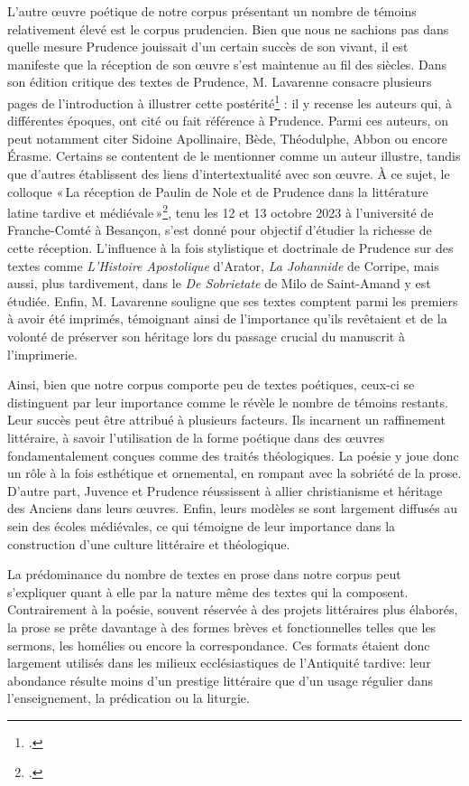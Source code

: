 \documentclass[a4paper,twoside,12pt]{book}
\begin{document}
L’autre œuvre poétique de notre corpus présentant un nombre de témoins relativement élevé est le corpus prudencien. Bien que nous ne sachions pas dans quelle mesure Prudence jouissait d’un certain succès de son vivant, il est manifeste que la réception de son œuvre s’est maintenue au fil des siècles. Dans son édition critique des textes de Prudence, M. Lavarenne consacre plusieurs pages de l’introduction à illustrer cette postérité\footcite[p. XVI–XXI]{Prudencelavarenne} : il y recense les auteurs qui, à différentes époques, ont cité ou  fait référence à Prudence. Parmi ces auteurs, on peut notamment citer Sidoine Apollinaire, Bède, Théodulphe, Abbon ou encore Érasme. Certains se contentent de le mentionner comme un auteur illustre, tandis que d’autres établissent des liens d’intertextualité avec son œuvre. À ce sujet, le colloque « La réception de Paulin de Nole et de Prudence dans la littérature latine tardive et médiévale »\footcite{receptionpaulinprudence}, tenu les 12 et 13 octobre 2023 à l’université de Franche-Comté à Besançon, s’est donné pour objectif d’étudier la richesse de cette réception. L'influence à la fois stylistique et doctrinale de Prudence sur des textes comme \textit{L’Histoire Apostolique} d’Arator, \textit{La Johannide} de Corripe, mais aussi, plus tardivement, dans le \textit{De Sobrietate} de Milo de Saint-Amand y est étudiée. Enfin, M. Lavarenne souligne que ses textes comptent parmi les premiers à avoir été imprimés, témoignant ainsi de l’importance qu’ils revêtaient et de la volonté de préserver son héritage lors du passage crucial du manuscrit à l’imprimerie.


Ainsi, bien que notre corpus comporte peu de textes poétiques, ceux-ci se distinguent par leur importance comme le révèle le nombre de témoins restants. Leur succès  peut être attribué à plusieurs facteurs. Ils incarnent un raffinement littéraire, à savoir l’utilisation de la forme poétique dans des œuvres fondamentalement conçues comme des traités théologiques. La poésie y joue donc un rôle à la fois esthétique et ornemental, en rompant avec la sobriété de la prose. D’autre part, Juvence et Prudence réussissent à allier christianisme et héritage des Anciens dans leurs œuvres. Enfin, leurs modèles se sont largement diffusés au sein des écoles médiévales, ce qui témoigne de leur importance dans la construction d’une culture littéraire et théologique.

La prédominance du nombre de textes en prose dans notre corpus peut s’expliquer quant à elle par la nature même des textes qui la composent. Contrairement à la poésie, souvent réservée à des projets littéraires plus élaborés, la prose se prête davantage à des formes brèves et fonctionnelles telles que les sermons, les homélies ou encore la correspondance. Ces formats étaient donc largement utilisés dans les milieux ecclésiastiques de l’Antiquité tardive:  leur abondance résulte moins d’un prestige littéraire que d’un usage régulier dans l’enseignement, la prédication ou la liturgie.	
\end{document}
